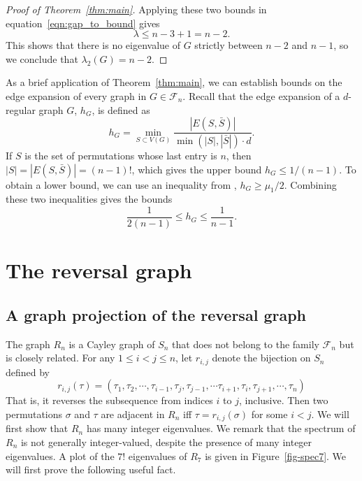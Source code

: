 \begin{proof}[Proof of Theorem~\ref{thm:main}]
  Applying these two bounds in equation~\ref{eqn:gap_to_bound} gives
  \[ \lambda \leq n-3 + 1 = n-2 . \]
  This shows that there is no eigenvalue of $G$ strictly between $n-2$ and $n-1$, so
  we conclude that  $\lambda_2(G) = n-2$.
\end{proof}


As a brief application of Theorem~\ref{thm:main}, we can establish bounds on the edge
expansion of every graph in $G \in \mathcal{F}_n$.  Recall that the edge
expansion of a $d$-regular graph $G$, $h_G$, is defined as
\[ h_G = \min_{S \subset V(G)} \frac{|E(S,\bar{S})|}{\min(|S|,|\bar{S}|) \cdot d} .\]
If $S$ is the set of permutations whose last entry is $n$, then
$|S| = |E(S,\bar{S})| = (n-1)!$, which gives the upper bound
$h_G \leq 1/(n-1)$.  To obtain a lower bound, we can use an inequality
from \cite{Chung1997},
$h_G \geq \mu_1 / 2$.   Combining these two inequalities gives the bounds
 \[ \frac{1}{2(n-1)} \leq h_G \leq \frac{1}{n-1} .\] 



\section{The reversal graph}\label{s6}

\subsection{A graph projection of the reversal graph}

The graph $R_n$ is a Cayley graph of $S_n$ that does not
belong to the family $\mathcal{F}_n$ but is closely related.  For any 
$1 \leq i<j \leq n$, let $r_{i,j}$ denote the bijection on $S_n$
defined by
 \[ r_{i,j}(\tau) =  (\tau_1, \tau_2, \cdots, \tau_{i-1}, \tau_{j}, \tau_{j-1}, \cdots \tau_{i+1}, \tau_i, \tau_{j+1}, \cdots , \tau_{n})\] 
That is, it reverses the subsequence from indices $i$ to $j$, inclusive.
Then two permutations $\sigma$ 
and $\tau$ are adjacent in $R_n$ iff $\tau = r_{i,j}(\sigma)$ for some $i< j$.  We will first  show that $R_n$ has many integer eigenvalues.  We remark that the spectrum of $R_n$ is not generally
integer-valued, despite the presence of many integer eigenvalues.  A plot of
the $7!$ eigenvalues of $R_7$ is given in Figure~\ref{fig-spec7}.  We will first prove the following useful fact.


